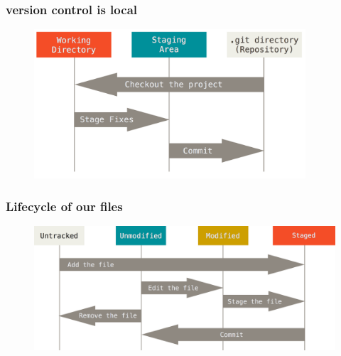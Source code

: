 \begin{frame}
    \frametitle{version control is local}
    \begin{figure}[b]{\textwidth}
        \centering
        \includegraphics[width=0.9\textwidth]{../img/three_states.png}
    \end{figure}
\end{frame}

\begin{frame}
    \frametitle{Lifecycle of our files}
    \begin{figure}[b]{\textwidth}
        \centering
            \includegraphics[width=\textwidth]{../img/file_lifecycle.png}
    \end{figure}
\end{frame}

